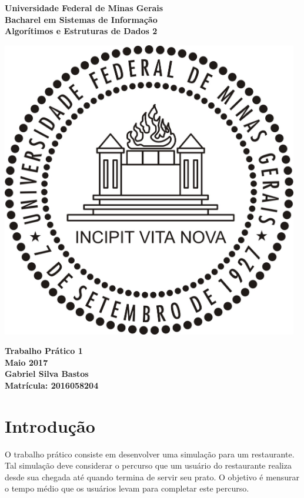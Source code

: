 \documentclass{article}
\begin{document}
\begin{titlepage}
  \centering
  
  \vfill{
    \bfseries\Huge
    Universidade Federal de Minas Gerais\\[5pt]
    \bfseries\Large
    Bacharel em Sistemas de Informação \\
    Algorítimos e Estruturas de Dados 2\\
  }
  
  \vfill
  
  \includegraphics[width=13cm]{images/ufmg_logo.jpg}
  
  \vfill{
    \bfseries\Large
    Trabalho Prático 1\\
    Maio 2017\\
  }
  \vfill{
    \bfseries\large
    Gabriel Silva Bastos\\[5pt]
    Matrícula: 2016058204
  }
\end{titlepage}


\section{Introdução}
O trabalho prático consiste em desenvolver uma simulação para um restaurante. Tal simulação deve considerar o percurso que um usuário do restaurante realiza desde sua chegada até quando termina de servir seu prato. O objetivo é mensurar o tempo médio que os usuários levam para completar este percurso.
\end{document}
